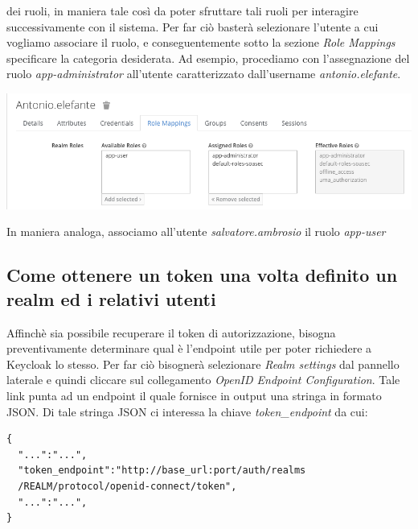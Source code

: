 \documentclass[twoside]{report}
\begin{document}
dei ruoli, in maniera tale così da poter sfruttare tali ruoli per interagire successivamente con il sistema.
\bigbreak
Per far ciò basterà selezionare l'utente a cui vogliamo associare il ruolo, e conseguentemente sotto la sezione \textit{Role Mappings} specificare la categoria desiderata.
\bigbreak
Ad esempio, procediamo con l'assegnazione del ruolo \textit{app-administrator} all'utente caratterizzato dall'username \textit{antonio.elefante}.

\begin{minipage}{\linewidth}
    \vspace{2mm}
    \centering
    \includegraphics[width= \linewidth]{16.png}
    \vspace{2mm}
\end{minipage} 

In maniera analoga, associamo all'utente \textit{salvatore.ambrosio} il ruolo \textit{app-user}

\subsection{Come ottenere un token una volta definito un realm ed i relativi utenti}

Affinchè sia possibile recuperare il token di autorizzazione, bisogna preventivamente determinare qual è l'endpoint utile per poter richiedere a Keycloak lo stesso.
\bigbreak
Per far ciò bisognerà selezionare \textit{Realm settings} dal pannello laterale e quindi cliccare sul collegamento \textit{OpenID Endpoint Configuration}.
\bigbreak
Tale link punta ad un endpoint il quale fornisce in output una stringa in formato JSON.
\bigbreak
Di tale stringa JSON ci interessa la chiave \textit{token\_endpoint} da cui:
\begin{listing}[h!]
\begin{verbatim}
{
  "...":"...",
  "token_endpoint":"http://base_url:port/auth/realms
  /REALM/protocol/openid-connect/token",
  "...":"...",
}
\end{verbatim}
\end{listing}
\FloatBarrier
\end{document}

